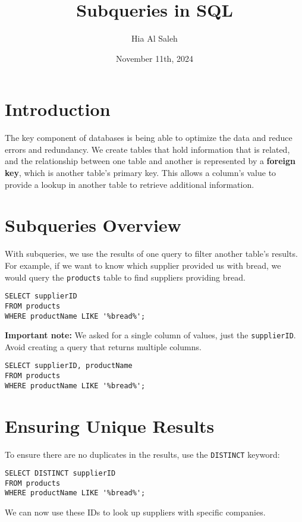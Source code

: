 \documentclass{article}
\begin{document}
\title{Subqueries in SQL}
\author{Hia Al Saleh}
\date{November 11th, 2024}
\maketitle
\tableofcontents
\newpage

\section{Introduction}
The key component of databases is being able to optimize the data and reduce errors and redundancy. We create tables that hold information that is related, and the relationship between one table and another is represented by a \textbf{foreign key}, which is another table’s primary key. This allows a column's value to provide a lookup in another table to retrieve additional information.

\section{Subqueries Overview}
With subqueries, we use the results of one query to filter another table’s results. For example, if we want to know which supplier provided us with bread, we would query the \texttt{products} table to find suppliers providing bread.

\begin{verbatim}
SELECT supplierID
FROM products
WHERE productName LIKE '%bread%';
\end{verbatim}

\textbf{Important note:} We asked for a single column of values, just the \texttt{supplierID}. Avoid creating a query that returns multiple columns.

\begin{verbatim}
SELECT supplierID, productName
FROM products
WHERE productName LIKE '%bread%';
\end{verbatim}

\section{Ensuring Unique Results}
To ensure there are no duplicates in the results, use the \texttt{DISTINCT} keyword:

\begin{verbatim}
SELECT DISTINCT supplierID
FROM products
WHERE productName LIKE '%bread%';
\end{verbatim}

We can now use these IDs to look up suppliers with specific companies.
\end{document}
